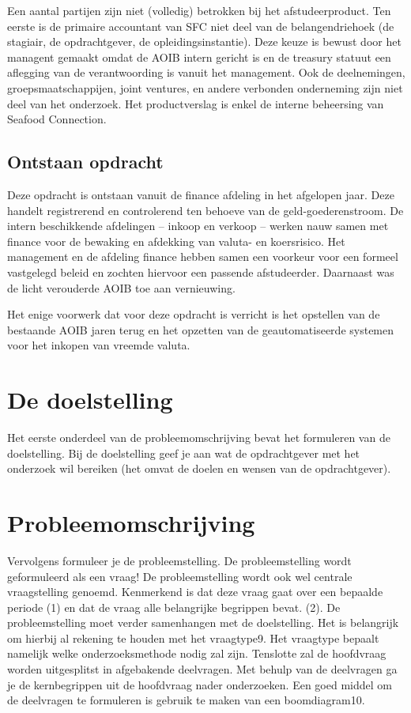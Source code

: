 \documentclass[10pt,a4paper,twoside]{report}
\begin{document}
Een aantal partijen zijn niet (volledig) betrokken bij het afstudeerproduct. Ten eerste is de primaire accountant van SFC niet deel van de belangendriehoek (de stagiair, de opdrachtgever, de opleidingsinstantie). Deze keuze is bewust door het managent gemaakt omdat de AOIB intern gericht is en de treasury statuut een aflegging van de verantwoording is vanuit het management. 
Ook de deelnemingen, groepsmaatschappijen, joint ventures, en andere verbonden onderneming zijn niet deel van het onderzoek. Het productverslag is enkel de interne beheersing van Seafood Connection.

\subsection{Ontstaan opdracht}
Deze opdracht is ontstaan vanuit de finance afdeling in het afgelopen jaar. Deze handelt registrerend en controlerend ten behoeve van de geld-goederenstroom. De intern beschikkende afdelingen – inkoop en verkoop – werken nauw samen met finance voor de bewaking en afdekking van valuta- en koersrisico. Het management en de afdeling finance hebben samen een voorkeur voor een formeel vastgelegd beleid en zochten hiervoor een passende afstudeerder. Daarnaast was de licht verouderde AOIB toe aan vernieuwing.

Het enige voorwerk dat voor deze opdracht is verricht is het opstellen van de bestaande AOIB jaren terug en het opzetten van de geautomatiseerde systemen voor het inkopen van vreemde valuta.

\section{De doelstelling}
Het eerste onderdeel van de probleemomschrijving bevat het formuleren van de doelstelling. Bij de doelstelling geef je aan wat de opdrachtgever met het onderzoek wil bereiken (het omvat de doelen en wensen van de opdrachtgever).

\section{Probleemomschrijving}
Vervolgens formuleer je de probleemstelling. De probleemstelling wordt geformuleerd als een vraag! De probleemstelling wordt ook wel centrale vraagstelling genoemd. Kenmerkend is dat deze vraag gaat over een bepaalde periode (1) en dat de vraag alle belangrijke begrippen bevat.
(2). De probleemstelling moet verder samenhangen met de doelstelling. Het is belangrijk om hierbij al rekening te houden met het vraagtype9. Het vraagtype bepaalt namelijk welke onderzoeksmethode nodig zal zijn. Tenslotte zal de hoofdvraag worden uitgesplitst in afgebakende deelvragen. Met behulp van de deelvragen ga je de kernbegrippen uit de hoofdvraag nader onderzoeken. Een goed middel om de deelvragen te formuleren is gebruik te maken van een boomdiagram10.
\end{document}
